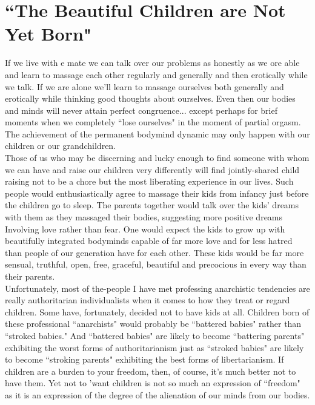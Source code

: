 \section*{``The Beautiful Children are Not Yet Born"}
If we live with e mate we can talk over our problems as honestly as we ore able and learn to massage each other regularly and generally and then erotically while we talk. If we are alone we'll learn to massage ourselves both generally and erotically while thinking good thoughts about ourselves. Even then our bodies and minds will never attain perfect congruence... except perhaps for brief moments when we completely ``lose ourselves" in the moment of partial orgasm. The achievement of the permanent bodymind dynamic may only happen with our children or our grandchildren.\\
Those of us who may be discerning and lucky enough to find someone with whom we can have and raise our children very differently will find jointly-shared child raising not to be a chore but the most liberating experience in our lives. Such people would enthusiastically agree to massage their kids from infancy just before the children go to sleep. The parents together would talk over the kids' dreams with them as they massaged their bodies, suggesting more positive dreams Involving love rather than fear. One would expect the kids to grow up with beautifully integrated bodyminds capable of far more love and for less hatred than people of our generation have for each other. These kids would be far more sensual, truthful, open, free, graceful, beautiful and precocious in every way than their parents.\\
Unfortunately, most of the-people I have met professing anarchistic tendencies are really authoritarian individualists when it comes to how they treat or regard children. Some have, fortunately, decided not to have kids at all. Children born of these professional ``anarchists" would probably be ``battered babies" rather than ``stroked babies." And ``battered babies" are likely to become ``battering parents" exhibiting the worst forms  of authoritarianism just as ``stroked babies" are likely to become ``stroking parents" exhibiting the best forms of libertarianism. If children are a burden to your freedom, then, of course, it's much better not to have them. Yet not to 'want children is not so much an expression of ``freedom" as it is an expression of the degree of the alienation of our minds from our bodies.

